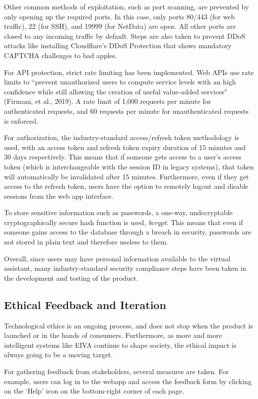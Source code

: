 \documentclass{article}
\begin{document}
Other common methods of exploitation, such as port scanning, are prevented by only opening up the required ports. In this case, only ports 80/443 (for web traffic), 22 (for SSH), and 19999 (for NetData) are open. All other ports are closed to any incoming traffic by default. Steps are also taken to prevent DDoS attacks like installing Cloudflare's DDoS Protection that shows mandatory CAPTCHA challenges to bad apples.

For API protection, strict rate limiting has been implemented. Web APIs use rate limits to ``prevent unauthorized users to compute service levels with an high confidence while still allowing the creation of useful value-added services" (Firmani, et al., 2019). A rate limit of 1,000 requests per minute for authenticated requests, and 60 requests per minute for unauthenticated requests is enforced.

For authorization, the industry-standard access/refresh token methodology is used, with an access token and refresh token expiry duration of 15 minutes and 30 days respectively. This means that if someone gets access to a user's access token (which is interchangeable with the session ID in legacy systems), that token will automatically be invalidated after 15 minutes. Furthermore, even if they get access to the refresh token, users have the option to remotely logout and disable sessions from the web app interface.

To store sensitive information such as passwords, a one-way, undecryptable cryptographically secure hash function is used, \emph{bcrypt}. This means that even if someone gains access to the database through a breach in security, passwords are not stored in plain text and therefore useless to them.

Overall, since users may have personal information available to the virtual assistant, many industry-standard security compliance steps have been taken in the development and testing of the product.

\subsection{Ethical Feedback and Iteration}

Technological ethics is an ongoing process, and does not stop when the product is launched or in the hands of consumers. Furthermore, as more and more intelligent systems like EIVA continue to shape society, the ethical impact is always going to be a moving target. 

For gathering feedback from stakeholders, several measures are taken. For example, users can log in to the webapp and access the feedback form by clicking on the `Help' icon on the bottom-right corner of each page.
\end{document}
